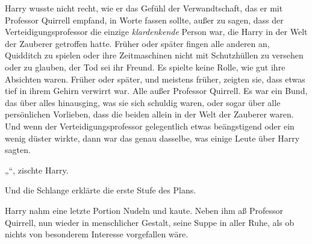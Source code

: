 Harry wusste nicht recht, wie er das Gefühl der Verwandtschaft, das er mit Professor Quirrell empfand, in Worte fassen sollte, außer zu sagen, dass der Verteidigungsprofessor die einzige \emph{klardenkende} Person war, die Harry in der Welt der Zauberer getroffen hatte. Früher oder später fingen alle anderen an, Quidditch zu spielen oder ihre Zeitmaschinen nicht mit Schutzhüllen zu versehen oder zu glauben, der Tod sei ihr Freund. Es spielte keine Rolle, wie gut ihre Absichten waren. Früher oder später, und meistens früher, zeigten sie, dass etwas tief in ihrem Gehirn verwirrt war. Alle außer Professor Quirrell. Es war ein Bund, das über alles hinausging, was sie sich schuldig waren, oder sogar über alle persönlichen Vorlieben, dass die beiden allein in der Welt der Zauberer waren. Und wenn der Verteidigungsprofessor gelegentlich etwas beängstigend oder ein wenig düster wirkte, dann war das genau dasselbe, was einige Leute über Harry sagten.

„“, zischte Harry.

Und die Schlange erklärte die erste Stufe des Plans.

\later

Harry nahm eine letzte Portion Nudeln und kaute. Neben ihm aß Professor Quirrell, nun wieder in menschlicher Gestalt, seine Suppe in aller Ruhe, als ob nichts von besonderem Interesse vorgefallen wäre.

